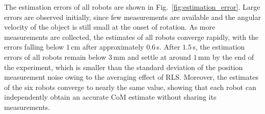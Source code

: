 The estimation errors of all robots are shown in Fig.~\ref{fig:estimation_error}. Large errors are observed initially, since few measurements are available and the angular velocity of the object is still small at the onset of rotation. As more measurements are collected, the estimates of all robots converge rapidly, with the errors falling below $1$\,cm after approximately $0.6$\,s. After $1.5$\,s, the estimation errors of all robots remain below $3$\,mm and settle at around $1$\,mm by the end of the experiment, which is smaller than the standard deviation of the position measurement noise owing to the averaging effect of RLS. Moreover, the estimates of the six robots converge to nearly the same value, showing that each robot can independently obtain an accurate CoM estimate without sharing its measurements.
